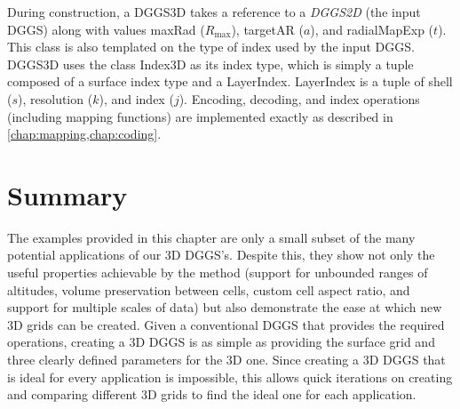 During construction, a DGGS3D takes a reference to a \textit{DGGS2D} (the input DGGS) along with values maxRad ($R_\mathrm{max}$), targetAR ($a$), and radialMapExp ($t$).
This class is also templated on the type of index used by the input DGGS.
DGGS3D uses the class Index3D as its index type, which is simply a tuple composed of a surface index type and a LayerIndex.
LayerIndex is a tuple of shell ($s$), resolution ($k$), and index ($j$).
Encoding, decoding, and index operations (including mapping functions) are implemented exactly as described in \cref{chap:mapping,chap:coding}.


\section{Summary}
The examples provided in this chapter are only a small subset of the many potential applications of our 3D DGGS's.
Despite this, they show not only the useful properties achievable by the method (support for unbounded ranges of altitudes, volume preservation between cells, custom cell aspect ratio, and support for multiple scales of data) but also demonstrate the ease at which new 3D grids can be created.
Given a conventional DGGS that provides the required operations, creating a 3D DGGS is as simple as providing the surface grid and three clearly defined parameters for the 3D one.
Since creating a 3D DGGS that is ideal for every application is impossible, this allows quick iterations on creating and comparing different 3D grids to find the ideal one for each application.
